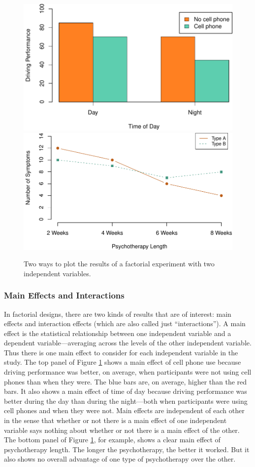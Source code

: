 \documentclass[
]{krantz}
\begin{document}
\begin{figure}

{\centering \includegraphics[width=0.7\linewidth]{08-complex-designs_files/figure-latex/plots-1} \includegraphics[width=0.7\linewidth]{08-complex-designs_files/figure-latex/plots-2} 

}

\caption{Two ways to plot the results of a factorial experiment with two independent variables.}\label{fig:plots}
\end{figure}

\hypertarget{main-effects-and-interactions}{%
\subsubsection*{Main Effects and Interactions}\label{main-effects-and-interactions}}


In factorial designs, there are two kinds of results that are of interest: main effects and interaction effects (which are also called just ``interactions''). A main effect is the statistical relationship between one independent variable and a dependent variable---averaging across the levels of the other independent variable. Thus there is one main effect to consider for each independent variable in the study. The top panel of Figure \ref{fig:plots} shows a main effect of cell phone use because driving performance was better, on average, when participants were not using cell phones than when they were. The blue bars are, on average, higher than the red bars. It also shows a main effect of time of day because driving performance was better during the day than during the night---both when participants were using cell phones and when they were not. Main effects are independent of each other in the sense that whether or not there is a main effect of one independent variable says nothing about whether or not there is a main effect of the other. The bottom panel of Figure \ref{fig:plots}, for example, shows a clear main effect of psychotherapy length. The longer the psychotherapy, the better it worked. But it also shows no overall advantage of one type of psychotherapy over the other.
\end{document}
